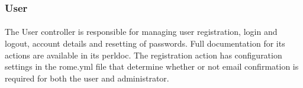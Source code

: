 \subsubsection{User}
\label{sec:controller_user}

\paragraph{}
The User controller is responsible for managing user registration, login and logout, account details and resetting of passwords. Full documentation for its actions are available in its perldoc. The registration action has configuration settings in the rome.yml file that determine whether or not email confirmation is required for both the user and administrator.




